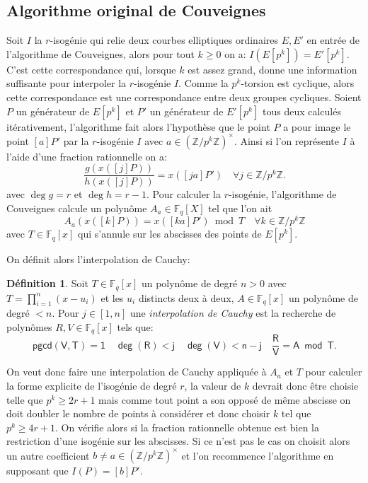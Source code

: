 \documentclass[10pt,a4paper]{book}
\theoremstyle{plain}
\theoremstyle{definition}
\theoremstyle{definition}
\theoremstyle{definition}
\theoremstyle{definition}
\theoremstyle{definition}
\newtheorem{defi}[thm]{Définition}
\theoremstyle{remark}
\theoremstyle{remark}
\theoremstyle{definition}
\begin{document}
\subsection{Algorithme original de Couveignes}
\label{sub:ori:cou}
Soit $I$ la $r$-isogénie qui relie deux courbes elliptiques ordinaires 
$E,E'$ en entrée de l'algorithme de Couveignes, alors pour tout $k \geqslant 0$
on a: $I(E[p^k])=E'[p^k]$. C'est cette correspondance qui, lorsque $k$ est 
assez grand, donne une information suffisante pour interpoler la $r$-isogénie 
$I$. Comme la $p^k$-torsion est cyclique, alors cette correspondance est une 
correspondance entre deux groupes cycliques. Soient $P$ un générateur de 
$E[p^k]$ et $P'$ un générateur de $E'[p^k]$ tous deux calculés itérativement, 
l'algorithme fait alors l'hypothèse que le point $P$ a pour image le point 
$[a]P'$ par la $r$-isogénie $I$ avec $a \in (\mathbb{Z}/p^k\mathbb{Z})^{\times}$. Ainsi si
l'on représente $I$ à l'aide d'une fraction rationnelle on a:
\begin{equation}
\frac{g(x([j] P))}{h(x([j] P))}=x([ja] P') \quad \forall j \in \mathbb{Z}/p^{k}\mathbb{Z}.
\end{equation}
avec $\deg g = r$ et $\deg h = r-1$.
Pour calculer la $r$-isogénie, l'algorithme de Couveignes calcule un polynôme $A_a \in \mathbb{F}_q[X]$ tel que l'on ait 
\begin{equation}
A_a(x([k] P))= x([ka] P') \bmod T \quad \forall k \in \mathbb{Z}/p^{k}\mathbb{Z}
\end{equation} 
avec $T \in \mathbb{F}_q[x]$ qui s'annule sur les abscisses des points de 
$E[p^k]$.

On définit alors l'interpolation de Cauchy:
\begin{defi}
Soit $T \in \mathbb{F}_q[x]$ un polynôme de degré $n>0$ avec 
$T=\prod_{i=1}^n(x-u_i)$ et les $u_i$ distincts deux à deux, 
$A \in \mathbb{F}_q[x]$ un polynôme de degré $<n$. Pour $j \in [1,n]$ une 
\emph{interpolation de Cauchy} est la recherche de polynômes $R,V \in \mathbb{F}_q[x]$
tels que:
\[
\mathsf{pgcd(V,T)=1 \quad \deg(R)<j \quad \deg(V)<n-j \quad \frac{R}{V}=A\bmod T}.
\]
\end{defi}
On veut donc faire une interpolation de Cauchy appliquée à $A_a$ et $T$ pour 
calculer la forme explicite de l'isogénie de degré $r$, la valeur de $k$ 
devrait donc être choisie telle que $p^k \geqslant 2 r +1$ mais comme tout 
point a son opposé de même abscisse on doit doubler le
nombre de points à considérer et donc choisir $k$ tel que 
$p^k \geqslant 4 r+1$. On vérifie alors si la fraction rationnelle obtenue est 
bien la restriction d'une isogénie sur les abscisses. Si ce n'est pas le cas on
choisit alors un autre coefficient $b \neq a \in 
\left( \mathbb{Z}/p^k \mathbb{Z} \right)^{\times}$ et l'on 
recommence l'algorithme en supposant que $I(P)=[b] P'$.
\end{document}

